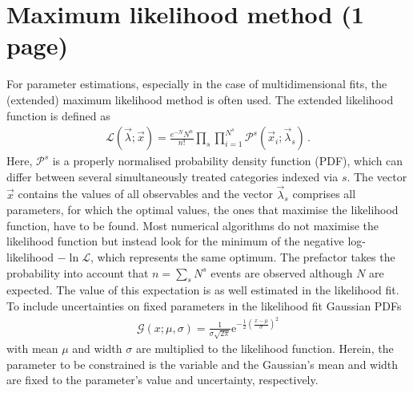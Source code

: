 
\section{Maximum likelihood method (1 page)}
\label{sec:dataanalysis:maximumlikelihood}

For parameter estimations, especially in the case of multidimensional fits,
the (extended) maximum likelihood method is often used. The extended
likelihood function is defined as
\begin{align}
	\label{eq:likelihood}
	\mathcal{L}(\vec{\lambda};\vec{x}) = \frac{e^{-N} N^n}{n!} \prod_{s} \prod_{i=1}^{N^s} \mathcal{P}^s(\vec{x}_i; \vec{\lambda}_s) \, .
\end{align}
Here, $\mathcal{P}^s$ is a properly normalised probability density function
(PDF), which can differ between several simultaneously treated categories
indexed via $s$. The vector $\vec{x}$ contains the values of all observables
and the vector $\vec{\lambda}_s$ comprises all parameters, for which the
optimal values, \ie the ones that maximise the likelihood function, have to be
found. Most numerical algorithms do not maximise the likelihood function but
instead look for the minimum of the negative log-likelihood $-\ln\mathcal{L}$,
which represents the same optimum. The prefactor takes the probability into
account that $n = \sum_s N^s$ events are observed although $N$ are expected.
The value of this expectation is as well estimated in the likelihood fit. To
include uncertainties on fixed parameters in the likelihood fit Gaussian PDFs
%
\begin{align}
\label{eq:dataanalysis:maximumlikelihood:constraint}
\mathcal{G}(x;\mu,\sigma) = \frac{1}{\sigma \sqrt{2 \pi}}\mathrm{e}^{-\frac{1}{2}\left(\frac{x-\mu}{\sigma}\right)^2}
\end{align}
%
with mean $\mu$ and width $\sigma$ are multiplied to the likelihood function.
Herein, the parameter to be constrained is the variable and the Gaussian's
mean and width are fixed to the parameter's value and uncertainty,
respectively.